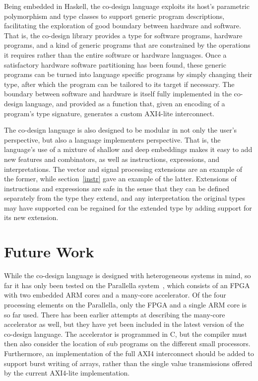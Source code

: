 \documentclass[../paper.tex]{subfiles}
\begin{document}
Being embedded in Haskell, the co-design language exploits its host's parametric polymorphism and type classes to support generic program descriptions, facilitating the exploration of good boundary between hardware and software. That is, the co-design library provides a type for software programs, hardware programs, and a kind of generic programs that are constrained by the operations it requires rather than the entire software or hardware languages. Once a satisfactory hardware software partitioning has been found, these generic programs can be turned into language specific programs by simply changing their type, after which the program can be tailored to its target if necessary. The boundary between software and hardware is itself fully implemented in the co-design language, and provided as a function that, given an encoding of a program's type signature, generates a custom AXI4-lite interconnect.

The co-design language is also designed to be modular in not only the user's perspective, but also a language implementers perspective. That is, the language's use of a mixture of shallow and deep embeddings makes it easy to add new features and combinators, as well as instructions, expressions, and interpretations. The vector and signal processing extensions are an example of the former, while section~\ref{instr} gave an example of the latter. Extensions of instructions and expressions are safe in the sense that they can be defined separately from the type they extend, and any interpretation the original types may have supported can be regained for the extended type by adding support for its new extension.

\section{Future Work}
\label{future}

While the co-design language is designed with heterogeneous systems in mind, so far it has only been tested on the Parallella system~\cite{olofsson2014}, which consists of an FPGA with two embedded ARM cores and a many-core accelerator. Of the four processing elements on the Parallella, only the FPGA and a single ARM core is so far used. There has been earlier attempts at describing the many-core accelerator as well, but they have yet been included in the latest version of the co-design language. The accelerator is programmed in C, but the compiler must then also consider the location of sub programs on the different small processors. Furthermore, an implementation of the full AXI4 interconnect should be added to support burst writing of arrays, rather than the single value transmissions offered by the current AXI4-lite implementation.
\end{document}

